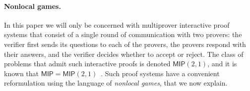 \documentclass[11pt]{article}
\theoremstyle{definition}
\newcommand{\class}[1]{\ensuremath{\mathsf{#1}}\xspace}
\newcommand{\MIP}{\class{MIP}} %
\begin{document}

\paragraph{Nonlocal games.}
In this paper we will only be concerned with multiprover interactive proof systems that consist of a single round of communication with two provers: the verifier first sends its questions to each of the provers, the provers respond with their answers, and the verifier decides whether to accept or reject. The class of problems that admit such interactive proofs is denoted $\MIP(2,1)$, and it is known that $\MIP=\MIP(2,1)$~\cite{feige1992two}. Such proof systems have a convenient reformulation using the language of \emph{nonlocal games}, that we now explain. 
\end{document}

